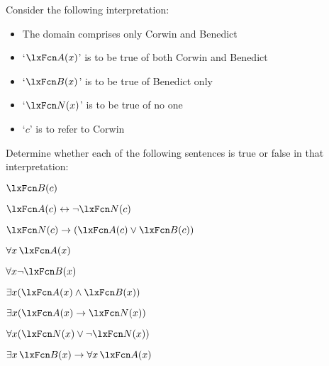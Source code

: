 \practiceproblems
\solutions
\problempart
\label{pr.TorF1}
Consider the following interpretation:
	\begin{itemize}
		\item The domain comprises only Corwin and Benedict
		\item `$\atom{A}{x}$' is to be true of both Corwin and Benedict
		\item `$\atom{B}{x}$' is to be true of Benedict only
		\item `$\atom{N}{x}$' is to be true of no one
		\item `$c$' is to refer to Corwin
	\end{itemize}
Determine whether each of the following sentences is true or false in that interpretation:
\begin{compactlist}
\item $\atom{B}{c} $
\item $\atom{A}{c}  \eiff \enot \atom{N}{c}$
\item $\atom{N}{c}  \eif (\atom{A}{c} \eor \atom{B}{c})$
\item $\forall x\, \atom{A}{x}$
\item $\forall x \enot \atom{B}{x}$
\item $\exists x(\atom{A}{x} \eand \atom{B}{x})$
\item $\exists x(\atom{A}{x} \eif \atom{N}{x})$
\item $\forall x(\atom{N}{x} \eor \enot \atom{N}{x})$
\item $\exists x\, \atom{B}{x} \eif \forall x\, \atom{A}{x}$
\end{compactlist}

